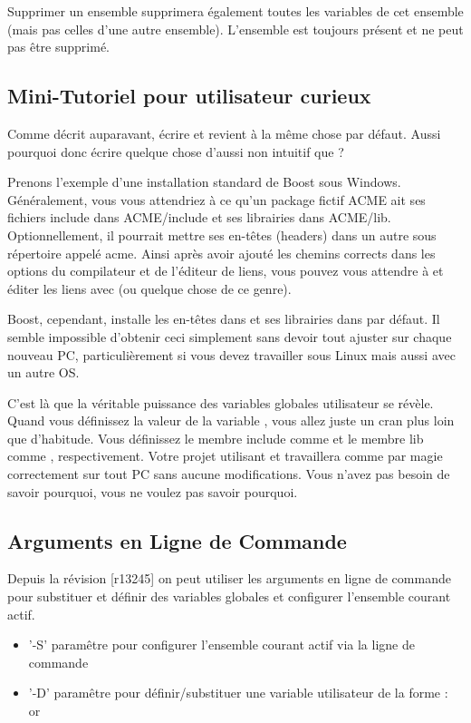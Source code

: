 Supprimer un ensemble supprimera également toutes les variables de cet ensemble (mais pas celles d'une autre ensemble). L'ensemble  est toujours présent et ne peut pas être supprimé.

\subsection{Mini-Tutoriel pour utilisateur curieux}\label{sec:mini_tutorial}

Comme décrit auparavant, écrire  et  revient à la même chose par défaut. Aussi pourquoi donc écrire quelque chose d'aussi non intuitif que ?

Prenons l'exemple d'une installation standard de Boost sous Windows. Généralement, vous vous attendriez à ce qu'un package fictif ACME ait ses fichiers include dans ACME/include et ses librairies dans ACME/lib. Optionnellement, il pourrait mettre ses en-têtes (headers) dans un autre sous répertoire appelé acme. Ainsi après avoir ajouté les chemins corrects dans les options du compilateur et de l'éditeur de liens, vous pouvez vous attendre à  et éditer les liens avec  (ou quelque chose de ce genre).

Boost, cependant, installe les en-têtes dans  et ses librairies dans  par défaut. Il semble impossible d'obtenir ceci simplement sans devoir tout ajuster sur chaque nouveau PC, particulièrement si vous devez travailler sous Linux mais aussi avec un autre OS.

C'est là que la véritable puissance des variables globales utilisateur se révèle. Quand vous définissez la valeur de la variable , vous allez juste un cran plus loin que d'habitude. Vous définissez le membre include comme  et le membre lib comme , respectivement. Votre projet utilisant  et  travaillera comme par magie correctement sur tout PC sans aucune modifications. Vous n'avez pas besoin de savoir pourquoi, vous ne voulez pas savoir pourquoi.

\subsection{Arguments en Ligne de Commande}\label{sec:cmdline_args}
Depuis la révision [r13245] on peut utiliser les arguments en ligne de commande pour substituer et définir des variables globales et configurer l'ensemble courant actif.
\begin{itemize}
\item '-S' paramêtre pour configurer l'ensemble courant actif via la ligne de commande
\item '-D' paramêtre pour définir/substituer une variable utilisateur de la forme :\\
  or 
\end{itemize}
